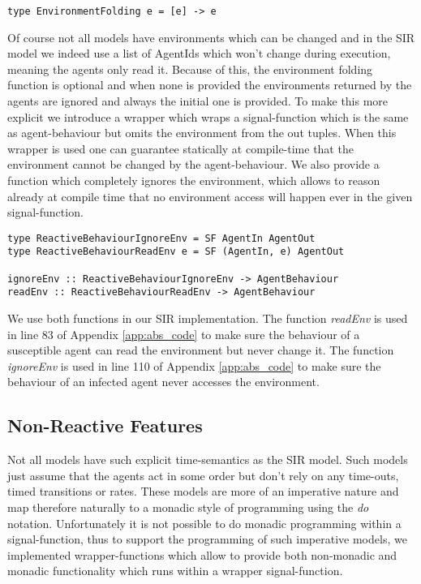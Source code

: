\begin{verbatim}
type EnvironmentFolding e = [e] -> e
\end{verbatim}

Of course not all models have environments which can be changed and in the SIR model we indeed use a list of AgentIds which won't change during execution, meaning the agents only read it. Because of this, the environment folding function is optional and when none is provided the environments returned by the agents are ignored and always the initial one is provided.
To make this more explicit we introduce a wrapper which wraps a signal-function which is the same as agent-behaviour but omits the environment from the out tuples. When this wrapper is used one can guarantee statically at compile-time that the environment cannot be changed by the agent-behaviour. We also provide a function which completely ignores the environment, which allows to reason already at compile time that no environment access will happen ever in the given signal-function.

\begin{verbatim}
type ReactiveBehaviourIgnoreEnv = SF AgentIn AgentOut
type ReactiveBehaviourReadEnv e = SF (AgentIn, e) AgentOut

ignoreEnv :: ReactiveBehaviourIgnoreEnv -> AgentBehaviour
readEnv :: ReactiveBehaviourReadEnv -> AgentBehaviour
\end{verbatim}

We use both functions in our SIR implementation. The function \textit{readEnv} is used in line 83 of Appendix \ref{app:abs_code} to make sure the behaviour of a susceptible agent can read the environment but never change it. The function \textit{ignoreEnv} is used in line 110 of Appendix \ref{app:abs_code} to make sure the behaviour of an infected agent never accesses the environment.

\subsection{Non-Reactive Features}
Not all models have such explicit time-semantics as the SIR model. Such models just assume that the agents act in some order but don't rely on any time-outs, timed transitions or rates. These models are more of an imperative nature and map therefore naturally to a monadic style of programming using the \textit{do} notation. Unfortunately it is not possible to do monadic programming within a signal-function, thus to support the programming of such imperative models, we implemented wrapper-functions which allow to provide both non-monadic and monadic functionality which runs within a wrapper signal-function.

